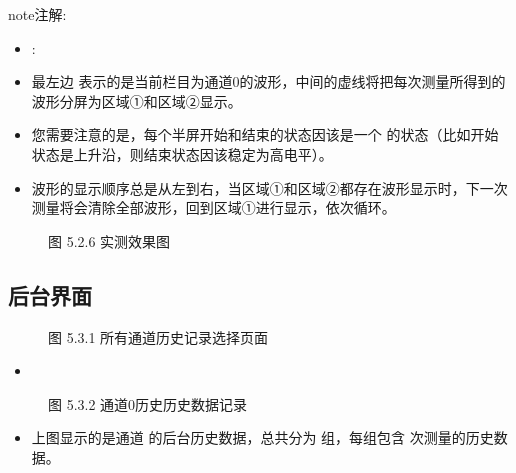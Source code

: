 \documentclass[a4paper,10pt,english]{sphinxmanual}
\begin{document}
\begin{sphinxadmonition}{note}{注解:}\begin{itemize}
\item {} 
\sphinxAtStartPar
{} :

\item {} 
\sphinxAtStartPar
最左边  表示的是当前栏目为通道0的波形，中间的虚线将把每次测量所得到的波形分屏为区域①和区域②显示。

\item {} 
\sphinxAtStartPar
您需要注意的是，每个半屏开始和结束的状态因该是一个  的状态（比如开始状态是上升沿，则结束状态因该稳定为高电平）。

\item {} 
\sphinxAtStartPar
波形的显示顺序总是从左到右，当区域①和区域②都存在波形显示时，下一次测量将会清除全部波形，回到区域①进行显示，依次循环。

\end{itemize}
\end{sphinxadmonition}

\begin{figure}[htbp]
\centering
\capstart

\noindent{}
\caption{图 5.2.6 实测效果图}\label{\detokenize{operation_guide:id14}}\end{figure}


\subsection{后台界面}
\label{\detokenize{operation_guide:id4}}
\begin{figure}[htbp]
\centering
\capstart

\noindent{}
\caption{图 5.3.1 所有通道历史记录选择页面}\label{\detokenize{operation_guide:id15}}\end{figure}
\begin{itemize}
\item {} 
\sphinxAtStartPar
{}

\end{itemize}

\begin{figure}[htbp]
\centering
\capstart

\noindent{}
\caption{图 5.3.2 通道0历史历史数据记录}\label{\detokenize{operation_guide:id16}}\end{figure}
\begin{itemize}
\item {} 
\sphinxAtStartPar
上图显示的是通道  的后台历史数据，总共分为  组，每组包含  次测量的历史数据。

\end{itemize}
\end{document}
